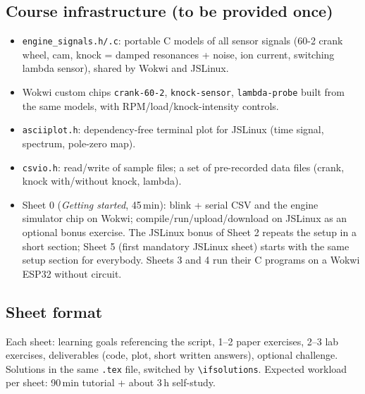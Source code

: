 \documentclass[11pt,a4paper]{article}
\begin{document}
\subsection*{Course infrastructure (to be provided once)}
\begin{itemize}
  \item \texttt{engine\_signals.h/.c}: portable C models of all sensor
    signals (60-2 crank wheel, cam, knock = damped resonances + noise,
    ion current, switching lambda sensor), shared by Wokwi and JSLinux.
  \item Wokwi custom chips \texttt{crank-60-2}, \texttt{knock-sensor}, \texttt{lambda-probe}
    built from the same models, with RPM/load/knock-intensity controls.
  \item \texttt{asciiplot.h}: dependency-free terminal plot for JSLinux
    (time signal, spectrum, pole-zero map).
  \item \texttt{csvio.h}: read/write of sample files; a set of
    pre-recorded data files (crank, knock with/without knock, lambda).
  \item Sheet 0 (\emph{Getting started}, 45\,min): blink + serial CSV and
    the engine simulator chip on Wokwi; compile/run/upload/download on
    JSLinux as an optional bonus exercise. The JSLinux bonus of Sheet 2
    repeats the setup in a short section; Sheet 5 (first mandatory
    JSLinux sheet) starts with the same setup section for everybody.
    Sheets 3 and 4 run their C programs on a Wokwi ESP32 without circuit.
\end{itemize}

\subsection*{Sheet format}
Each sheet: learning goals referencing the script, 1--2 paper exercises,
2--3 lab exercises, deliverables (code, plot, short written answers),
optional challenge. Solutions in the same \texttt{.tex} file, switched by
\verb|\ifsolutions|. Expected workload per sheet: 90\,min tutorial
+ about 3\,h self-study.
\end{document}
